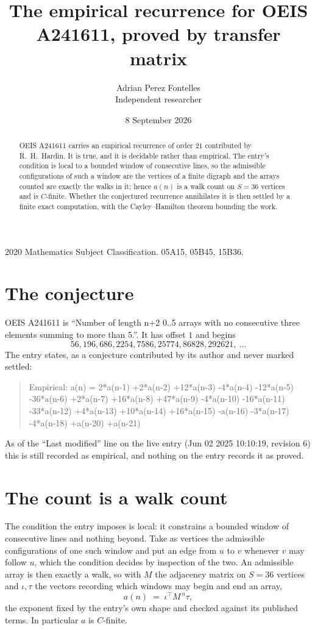 \documentclass[11pt,a4paper]{article}
\title{The empirical recurrence for OEIS A241611, proved by transfer matrix}
\author{Adrian Perez Fontelles\\ \small Independent researcher}
\date{8 September 2026}
\theoremstyle{plain}
\theoremstyle{definition}
\begin{document}
\maketitle

\begin{abstract}
OEIS A241611 carries an empirical recurrence of order $21$ contributed by R.~H.~Hardin. It is
true, and it is decidable rather than empirical. The entry's condition is local to a bounded window of consecutive lines, so
the admissible configurations of such a window are the vertices of a finite digraph and the
arrays counted are exactly the walks in it; hence $a(n)$ is a walk count on $S=36$ vertices
and is $C$-finite. Whether the conjectured recurrence annihilates it is then settled by a
finite exact computation, with the Cayley--Hamilton theorem bounding the work.
\end{abstract}

\noindent\small 2020 Mathematics Subject Classification. 05A15, 05B45, 15B36.\normalsize

\section{The conjecture}

OEIS A241611 is ``Number of length n+2 0..5 arrays with no consecutive three elements summing to more than 5.''. It has offset $1$ and begins
\[
56, 196, 686, 2254, 7586, 25774, 86828, 292621,\ \dots
\]
The entry states, as a conjecture contributed by its author and never marked settled:
\begin{quote}
Empirical: a(n) = 2*a(n-1) +2*a(n-2) +12*a(n-3) -4*a(n-4) -12*a(n-5) -36*a(n-6) +2*a(n-7) +16*a(n-8) +47*a(n-9) -4*a(n-10) -16*a(n-11) -33*a(n-12) +4*a(n-13) +10*a(n-14) +16*a(n-15) -a(n-16) -3*a(n-17) -4*a(n-18) +a(n-20) +a(n-21)
\end{quote}
As of the ``Last modified'' line on the live entry (Jun 02 2025 10:10:19, revision 6) this is still
recorded as empirical, and nothing on the entry records it as proved.

\section{The count is a walk count}

The condition the entry imposes is local: it constrains a bounded window of consecutive lines and nothing beyond. Take as
vertices the admissible configurations of one such window and put an edge from $u$ to $v$
whenever $v$ may follow $u$, which the condition decides by inspection of the two. An
admissible array is then exactly a walk, so with $M$ the adjacency matrix on $S=36$ vertices
and $\iota,\tau$ the vectors recording which windows may begin and end an array,
\[
a(n)\;=\;\iota^{\!\top}M^{\,n}\tau ,
\]
the exponent fixed by the entry's own shape and checked against its published terms. In
particular $a$ is $C$-finite.
\end{document}
